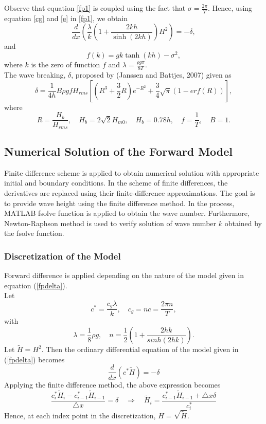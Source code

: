 \noindent Observe that equation \ref{fp1} is coupled using the fact that $\sigma=\frac{2\pi}{T}$. Hence, using equation \ref{cg} and \ref{e} in \ref{fp1}, we obtain
\begin{equation}
\label{fpdelta}
\frac{d}{dx}\left( \frac{\lambda}{k}\left(1+\frac{2kh}{\sinh(2kh)}\right)H^2 \right)=-\delta,
\end{equation}  
and 
\begin{equation}
\label{fk}
f(k) = gk\tanh(kh)-\sigma^2,
\end{equation}
where $k$ is the zero of function $f$ and $\lambda=\frac{\rho g \pi}{8T}$.\\
The wave breaking, $\delta$, proposed by (Janssen and Battjes, 2007) given as
\begin{equation}
\delta = \frac{1}{4h}B\rho g f H_{rms}\left[(R^3+\frac{3}{2}R)e^{-R^2}+\frac{3}{4}\sqrt{\pi}(1-erf(R))\right],
\end{equation}
where $$R=\frac{H_b}{H_{rms}}, \quad H_b = 2\sqrt{2}H_{m0},\quad H_b=0.78h,\quad f=\frac{1}{T},\quad B=1.$$
\subsection{Numerical Solution of the Forward Model}
Finite difference scheme is applied to obtain numerical solution with appropriate initial and boundary conditions. In the scheme of finite differences, the derivatives are replaced using their finite-difference approximations. The goal is to provide wave height using the finite difference method. In the process, MATLAB fsolve function is applied to obtain the wave number. Furthermore, Newton-Raphson method is used to verify solution of wave number $k$ obtained by the fsolve function.
\subsubsection{Discretization of the Model}
Forward difference is applied depending on the nature of the model given in equation (\ref{fpdelta}).\\
Let 
$$c^{*} = \frac{c_{g}\lambda}{k},\quad c_{g} = nc =\frac{2\pi n}{T},$$
with 
$$\lambda = \frac{1}{8}\rho g, \quad n = \frac{1}{2}\left(1+\frac{2hk}{sinh(2hk)}\right).$$
Let $\widetilde{H}=H^{2}$. Then the ordinary differential equation of the model given in (\ref{fpdelta}) becomes
\begin{equation}
\frac{d}{dx}\left( c^{*}\widetilde{H}\right)=-\delta
\end{equation}
Applying the finite difference method, the above expression becomes
$$
\frac{c_{i}^{*}\widetilde{H}_{i}-c_{i-1}^{*}\tilde{H}_{i-1}}{\triangle x}= \delta \quad \Rightarrow \quad
\widetilde{H}_{i}=\frac{c_{i-1}^{*}\widetilde{H}_{i-1}+\triangle x \delta}{c_{i}^{*}}
$$
Hence, at each index point in the discretization, $
H=\sqrt{\widetilde{H}}$.

